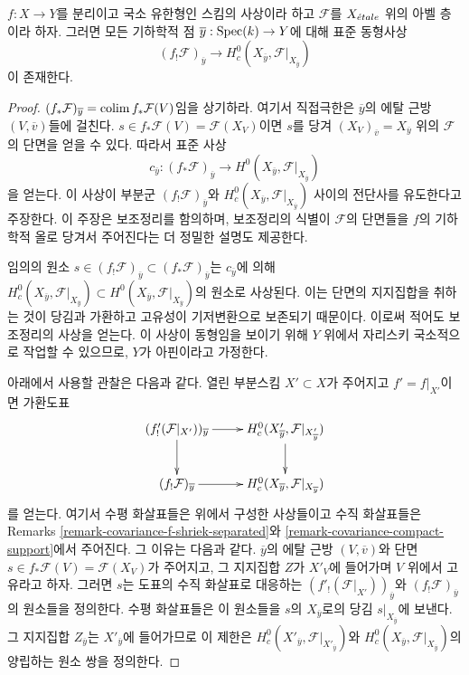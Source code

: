 \begin{lemma}
\label{lemma-stalk-f-shriek-separated}
$f : X \to Y$를 분리이고 국소 유한형인 스킴의 사상이라 하고
$\mathcal{F}$를 $X_{\acute{e}tale}$ 위의 아벨 층이라 하자. 그러면 모든
기하학적 점 $\overline{y} : \mathop{\mathrm{Spec}}(k) \to Y$에 대해 표준 동형사상
$$
(f_!\mathcal{F})_{\overline{y}}
\longrightarrow
H^0_c(X_{\overline{y}}, \mathcal{F}|_{X_{\overline{y}}})
$$
이 존재한다.
\end{lemma}

\begin{proof}
$(f_*\mathcal{F})_{\overline{y}} = \mathop{\mathrm{colim}}\nolimits f_*\mathcal{F}(V)$임을
상기하라. 여기서 직접극한은 $\overline{y}$의 에탈 근방
$(V,\overline{v})$들에 걸친다.
$s \in f_*\mathcal{F}(V) = \mathcal{F}(X_V)$이면 $s$를 당겨
$(X_V)_{\overline{v}} = X_{\overline{y}}$ 위의 $\mathcal{F}$의 단면을
얻을 수 있다. 따라서 표준 사상
$$
c_{\overline{y}} :
(f_*\mathcal{F})_{\overline{y}}
\longrightarrow 
H^0(X_{\overline{y}}, \mathcal{F}|_{X_{\overline{y}}})
$$
을 얻는다. 이 사상이 부분군
$(f_!\mathcal{F})_{\overline{y}}$와
$H^0_c(X_{\overline{y}},\mathcal{F}|_{X_{\overline{y}}})$ 사이의
전단사를 유도한다고 주장한다. 이 주장은 보조정리를 함의하며,
보조정리의 식별이 $\mathcal{F}$의 단면들을 $f$의 기하학적 올로
당겨서 주어진다는 더 정밀한 설명도 제공한다.

\medskip\noindent
임의의 원소
$s \in (f_!\mathcal{F})_{\overline{y}} \subset
(f_*\mathcal{F})_{\overline{y}}$는 $c_{\overline{y}}$에 의해
$H^0_c(X_{\overline{y}}, \mathcal{F}|_{X_{\overline{y}}}) \subset
H^0(X_{\overline{y}}, \mathcal{F}|_{X_{\overline{y}}})$의 원소로
사상된다. 이는 단면의 지지집합을 취하는 것이 당김과
가환하고 고유성이 기저변환으로 보존되기 때문이다. 이로써 적어도
보조정리의 사상을 얻는다. 이 사상이 동형임을 보이기 위해 $Y$ 위에서
자리스키 국소적으로 작업할 수 있으므로, $Y$가 아핀이라고 가정한다.

\medskip\noindent
아래에서 사용할 관찰은 다음과 같다. 열린 부분스킴 $X' \subset X$가
주어지고 $f' = f|_{X'}$이면 가환도표
$$
\xymatrix{
(f'_!(\mathcal{F}|_{X'}))_{\overline{y}} \ar[r] \ar[d] &
H^0_c(X'_{\overline{y}}, \mathcal{F}|_{X'_{\overline{y}}}) \ar[d] \\
(f_!\mathcal{F})_{\overline{y}} \ar[r] &
H^0_c(X_{\overline{y}}, \mathcal{F}|_{X_{\overline{y}}})
}
$$
를 얻는다. 여기서 수평 화살표들은 위에서 구성한 사상들이고 수직
화살표들은 Remarks \ref{remark-covariance-f-shriek-separated}와
\ref{remark-covariance-compact-support}에서 주어진다. 그 이유는
다음과 같다. $\overline{y}$의 에탈 근방
$(V,\overline{v})$와 단면
$s \in f_*\mathcal{F}(V) = \mathcal{F}(X_V)$가 주어지고, 그 지지집합
$Z$가 $X'_V$에 들어가며 $V$ 위에서 고유라고 하자. 그러면 $s$는
도표의 수직 화살표로 대응하는
$(f'_!(\mathcal{F}|_{X'}))_{\overline{y}}$와
$(f_!\mathcal{F})_{\overline{y}}$의 원소들을 정의한다. 수평 화살표들은
이 원소들을 $s$의 $X_{\overline{y}}$로의 당김
$s|_{X_{\overline{y}}}$에 보낸다. 그 지지집합
$Z_{\overline{y}}$는 $X'_{\overline{y}}$에 들어가므로 이 제한은
$H^0_c(X'_{\overline{y}},\mathcal{F}|_{X'_{\overline{y}}})$와
$H^0_c(X_{\overline{y}},\mathcal{F}|_{X_{\overline{y}}})$의 양립하는
원소 쌍을 정의한다.


\end{proof}
